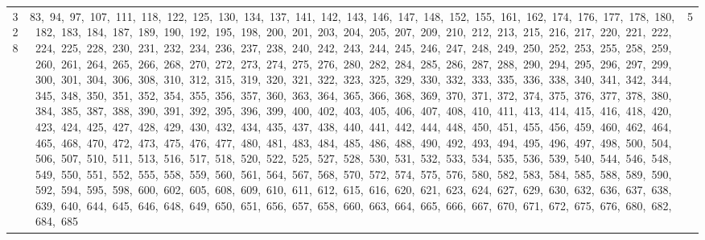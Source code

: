 \begin{longtable}{c|p{}|r}
328 & 83,\ 94,\ 97,\ 107,\ 111,\ 118,\ 122,\ 125,\ 130,\ 134,\ 137,\ 141,\ 142,\ 143,\ 146,\ 147,\ 148,\ 152,\ 155,\ 161,\ 162,\ 174,\ 176,\ 177,\ 178,\ 180,\ 182,\ 183,\ 184,\ 187,\ 189,\ 190,\ 192,\ 195,\ 198,\ 200,\ 201,\ 203,\ 204,\ 205,\ 207,\ 209,\ 210,\ 212,\ 213,\ 215,\ 216,\ 217,\ 220,\ 221,\ 222,\ 224,\ 225,\ 228,\ 230,\ 231,\ 232,\ 234,\ 236,\ 237,\ 238,\ 240,\ 242,\ 243,\ 244,\ 245,\ 246,\ 247,\ 248,\ 249,\ 250,\ 252,\ 253,\ 255,\ 258,\ 259,\ 260,\ 261,\ 264,\ 265,\ 266,\ 268,\ 270,\ 272,\ 273,\ 274,\ 275,\ 276,\ 280,\ 282,\ 284,\ 285,\ 286,\ 287,\ 288,\ 290,\ 294,\ 295,\ 296,\ 297,\ 299,\ 300,\ 301,\ 304,\ 306,\ 308,\ 310,\ 312,\ 315,\ 319,\ 320,\ 321,\ 322,\ 323,\ 325,\ 329,\ 330,\ 332,\ 333,\ 335,\ 336,\ 338,\ 340,\ 341,\ 342,\ 344,\ 345,\ 348,\ 350,\ 351,\ 352,\ 354,\ 355,\ 356,\ 357,\ 360,\ 363,\ 364,\ 365,\ 366,\ 368,\ 369,\ 370,\ 371,\ 372,\ 374,\ 375,\ 376,\ 377,\ 378,\ 380,\ 384,\ 385,\ 387,\ 388,\ 390,\ 391,\ 392,\ 395,\ 396,\ 399,\ 400,\ 402,\ 403,\ 405,\ 406,\ 407,\ 408,\ 410,\ 411,\ 413,\ 414,\ 415,\ 416,\ 418,\ 420,\ 423,\ 424,\ 425,\ 427,\ 428,\ 429,\ 430,\ 432,\ 434,\ 435,\ 437,\ 438,\ 440,\ 441,\ 442,\ 444,\ 448,\ 450,\ 451,\ 455,\ 456,\ 459,\ 460,\ 462,\ 464,\ 465,\ 468,\ 470,\ 472,\ 473,\ 475,\ 476,\ 477,\ 480,\ 481,\ 483,\ 484,\ 485,\ 486,\ 488,\ 490,\ 492,\ 493,\ 494,\ 495,\ 496,\ 497,\ 498,\ 500,\ 504,\ 506,\ 507,\ 510,\ 511,\ 513,\ 516,\ 517,\ 518,\ 520,\ 522,\ 525,\ 527,\ 528,\ 530,\ 531,\ 532,\ 533,\ 534,\ 535,\ 536,\ 539,\ 540,\ 544,\ 546,\ 548,\ 549,\ 550,\ 551,\ 552,\ 555,\ 558,\ 559,\ 560,\ 561,\ 564,\ 567,\ 568,\ 570,\ 572,\ 574,\ 575,\ 576,\ 580,\ 582,\ 583,\ 584,\ 585,\ 588,\ 589,\ 590,\ 592,\ 594,\ 595,\ 598,\ 600,\ 602,\ 605,\ 608,\ 609,\ 610,\ 611,\ 612,\ 615,\ 616,\ 620,\ 621,\ 623,\ 624,\ 627,\ 629,\ 630,\ 632,\ 636,\ 637,\ 638,\ 639,\ 640,\ 644,\ 645,\ 646,\ 648,\ 649,\ 650,\ 651,\ 656,\ 657,\ 658,\ 660,\ 663,\ 664,\ 665,\ 666,\ 667,\ 670,\ 671,\ 672,\ 675,\ 676,\ 680,\ 682,\ 684,\ 685 & 5 \\

\end{longtable}
